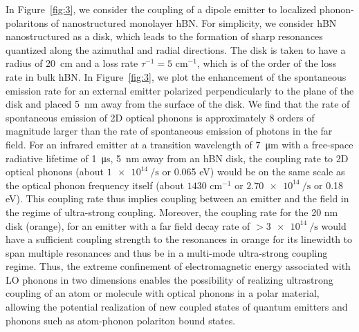 \documentclass[aps,prb,twocolumn,
	           groupedaddress,superscriptaddress,
               amsfonts,amssymb,amsmath,floatfix,
	           citeautoscript]{revtex4-1}
\begin{document}
In Figure~\ref{fig:3}, we consider the coupling of a dipole emitter to localized phonon-polaritons of nanostructured monolayer hBN. For simplicity, we consider hBN nanostructured as a disk, which leads to the formation of sharp resonances quantized along the azimuthal and radial directions. The disk is taken to have a radius of \SI{20}{cm} and a loss rate $\tau^{-1} = 5$ cm$^{-1}$, which is of the order of the loss rate in bulk hBN. In Figure~\ref{fig:3}, we plot the enhancement of the spontaneous emission rate for an external emitter polarized perpendicularly to the plane of the disk and placed \SI{5}{\nm} away from the surface of the disk. We find that the rate of spontaneous emission of 2D optical phonons is approximately 8 orders of magnitude larger than the rate of spontaneous emission of photons in the far field. For an infrared emitter at a transition wavelength of \SI{7}{\micro\m} with a free-space radiative lifetime of \SI{1}{\micro\s}, \SI{5}{\nm} away from an hBN disk, the coupling rate to 2D optical phonons (about $\SI{1e14}{\per\s}$ or 0.065 eV) would be on the same scale as the optical phonon frequency itself (about $1430$ cm$^{-1}$ or $\SI{2.70e14}{\per\s}$ or 0.18 eV). This coupling rate thus implies coupling between an emitter and the field in the regime of ultra-strong coupling. Moreover, the coupling rate for the 20 nm disk (orange), for an emitter with a far field decay rate of $> \SI{3e14}{\per\s}$ would have a sufficient coupling strength to the resonances in orange for its linewidth to span multiple resonances and thus be in a multi-mode ultra-strong coupling regime. Thus, the extreme confinement of electromagnetic energy associated with LO phonons in two dimensions enables the possibility of realizing ultrastrong coupling of an atom or molecule with optical phonons in a polar material, allowing the potential realization of new coupled states of quantum emitters and phonons such as atom-phonon polariton bound states.
\end{document}
